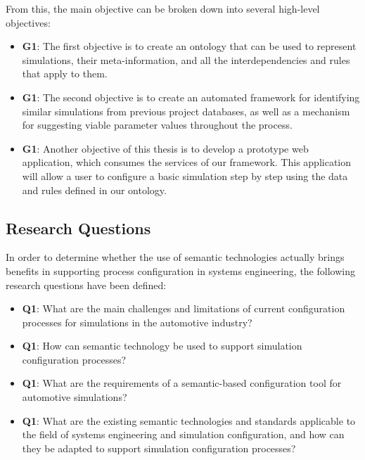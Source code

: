 From this, the main objective can be broken down into several high-level objectives:

\begin{itemize}
  \item \textbf{G1\label{G1}}: The first objective is to create an ontology that can be used to represent simulations, their meta-information, and all the interdependencies and rules that apply to them.

    \item \textbf{G1\label{G2}}: The second objective is to create an automated framework for identifying similar simulations from previous project databases, as well as a mechanism for suggesting viable parameter values throughout the process.
    
    \item \textbf{G1\label{G3}}: Another objective of this thesis is to develop a prototype web application, which consumes the services of our framework. This application will allow a user to configure a basic simulation step by step using the data and rules defined in our ontology.

\end{itemize}


\subsection{Research Questions\label{subsec:reseques}}

In order to determine whether the use of semantic technologies actually brings benefits in supporting process configuration in systems engineering, the following research questions have been defined: 

\begin{itemize}
  \item \textbf{Q1\label{Q1}}: What are the main challenges and limitations of current configuration processes for simulations in the automotive industry?
    \item \textbf{Q1\label{Q2}}: How can semantic technology be used to support simulation configuration processes?
    \item \textbf{Q1\label{Q3}}: What are the requirements of a semantic-based configuration tool for automotive simulations?
    \item \textbf{Q1\label{Q4}}: What are the existing semantic technologies and standards applicable to the field of systems engineering and simulation configuration, and how can they be adapted to support simulation configuration processes?
 \end{itemize}



